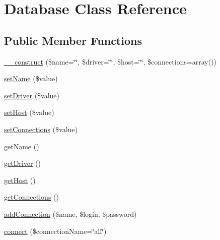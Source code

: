 \hypertarget{classDatabase}{\section{Database Class Reference}
\label{classDatabase}
}
\subsection*{Public Member Functions}
\begin{DoxyCompactItemize}
\item 
\hyperlink{classDatabase_a7883d28cdbffc2b417a4fbc9733fc68b}{\-\_\-\-\_\-construct} (\$name=\char`\"{}\char`\"{}, \$driver=\char`\"{}\char`\"{}, \$host=\char`\"{}\char`\"{}, \$connections=array())
\item 
\hyperlink{classDatabase_a73cb6eec277ccab50a2fa115487acbba}{set\-Name} (\$value)
\item 
\hyperlink{classDatabase_a462346c13a5fe2fb44f2b1724b538394}{set\-Driver} (\$value)
\item 
\hyperlink{classDatabase_a49df1afe26bb06f4d0cc623b95bd78ce}{set\-Host} (\$value)
\item 
\hyperlink{classDatabase_ad20b8a013d88e7204a9ead110d7a7e05}{set\-Connections} (\$value)
\item 
\hyperlink{classDatabase_ac73651dd458c78c0b8e98c5c3f47fa19}{get\-Name} ()
\item 
\hyperlink{classDatabase_a8ad30c4547ad0ed29ced3a83e6d0eff7}{get\-Driver} ()
\item 
\hyperlink{classDatabase_a66c7395bd86115c24161f96b9e7d6601}{get\-Host} ()
\item 
\hyperlink{classDatabase_aae9562910804b3fb0b14187f02ff2699}{get\-Connections} ()
\item 
\hyperlink{classDatabase_ae1081b7ad1fb0da55c3d89818cb6c48b}{add\-Connection} (\$name, \$login, \$password)
\item 
\hyperlink{classDatabase_a7c762fc601f4674513d131ea10384802}{connect} (\$connection\-Name=\char`\"{}all\char`\"{})
\end{DoxyCompactItemize}
